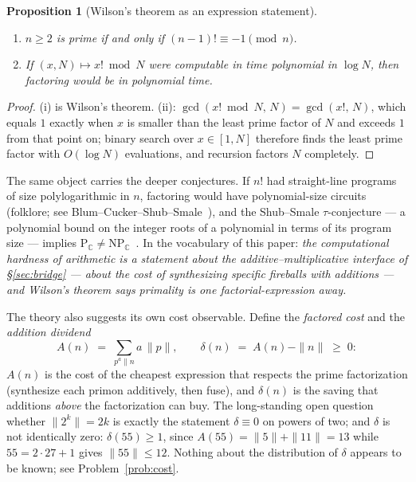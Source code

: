 \documentclass[11pt]{article}
\numberwithin{equation}{section}
\theoremstyle{plain}
\newtheorem{proposition}[theorem]{Proposition}
\theoremstyle{definition}
\theoremstyle{remark}
\begin{document}
\begin{proposition}[Wilson's theorem as an expression statement]\label{prop:wilson}
\begin{enumerate}
\item[(i)] $n \ge 2$ is prime if and only if $(n-1)! \equiv -1 \pmod n$.
\item[(ii)] If $(x, N) \mapsto x! \bmod N$ were computable in time polynomial in
$\log N$, then factoring would be in polynomial time.
\end{enumerate}
\end{proposition}

\begin{proof}
(i) is Wilson's theorem. (ii): $\gcd(x! \bmod N,\, N) = \gcd(x!,\, N)$, which equals
$1$ exactly when $x$ is smaller than the least prime factor of $N$ and exceeds $1$
from that point on; binary search over $x \in [1, N]$ therefore finds the least prime
factor with $O(\log N)$ evaluations, and recursion factors $N$ completely.
\end{proof}

The same object carries the deeper conjectures. If $n!$ had straight-line programs of
size polylogarithmic in $n$, factoring would have polynomial-size circuits (folklore;
see Blum--Cucker--Shub--Smale~\cite{bcss}), and the Shub--Smale $\tau$-conjecture ---
a polynomial bound on the integer roots of a polynomial in terms of its program size
--- implies $\mathrm{P}_{\mathbb C} \neq \mathrm{NP}_{\mathbb C}$~\cite{shubsmale}.
In the vocabulary of this paper: \emph{the computational hardness of arithmetic is a
statement about the additive--multiplicative interface of \S\ref{sec:bridge} ---
about the cost of synthesizing specific fireballs with additions --- and Wilson's
theorem says primality is one factorial-expression away.}

The theory also suggests its own cost observable. Define the \emph{factored cost} and
the \emph{addition dividend}
\[
A(n) \;=\; \sum_{p^a \parallel n} a\,\|p\|,
\qquad
\delta(n) \;=\; A(n) - \|n\| \;\ge\; 0:
\]
$A(n)$ is the cost of the cheapest expression that respects the prime factorization
(synthesize each primon additively, then fuse), and $\delta(n)$ is the saving that
additions \emph{above} the factorization can buy. The long-standing open question
whether $\|2^k\| = 2k$ is exactly the statement $\delta \equiv 0$ on powers of two;
and $\delta$ is not identically zero: $\delta(55) \ge 1$, since
$A(55) = \|5\| + \|11\| = 13$ while $55 = 2 \cdot 27 + 1$ gives $\|55\| \le 12$.
Nothing about the distribution of $\delta$ appears to be known; see
Problem~\ref{prob:cost}.
\end{document}

